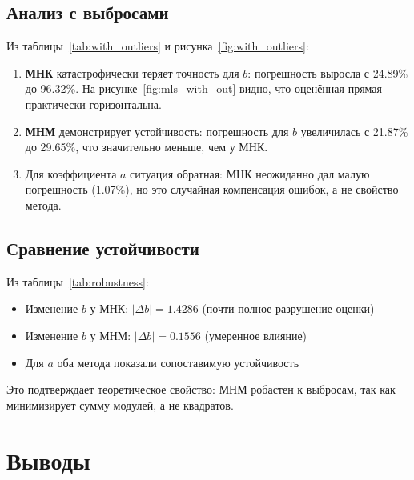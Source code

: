 \documentclass[12pt, a4paper]{article}
\begin{document}
\subsection{Анализ с выбросами}

Из таблицы~\ref{tab:with_outliers} и рисунка~\ref{fig:with_outliers}:
\begin{enumerate}
    \item \textbf{МНК} катастрофически теряет точность для $b$: погрешность выросла с 24.89\% до 96.32\%. На рисунке~\ref{fig:mls_with_out} видно, что оценённая прямая практически горизонтальна.
    
    \item \textbf{МНМ} демонстрирует устойчивость: погрешность для $b$ увеличилась с 21.87\% до 29.65\%, что значительно меньше, чем у МНК.
    
    \item Для коэффициента $a$ ситуация обратная: МНК неожиданно дал малую погрешность (1.07\%), но это случайная компенсация ошибок, а не свойство метода.
\end{enumerate}

\subsection{Сравнение устойчивости}

Из таблицы~\ref{tab:robustness}:
\begin{itemize}
    \item Изменение $b$ у МНК: $|\Delta b| = 1.4286$ (почти полное разрушение оценки)
    \item Изменение $b$ у МНМ: $|\Delta b| = 0.1556$ (умеренное влияние)
    \item Для $a$ оба метода показали сопоставимую устойчивость
\end{itemize}

Это подтверждает теоретическое свойство: МНМ робастен к выбросам, так как минимизирует сумму модулей, а не квадратов.

\section{Выводы}
\end{document}
